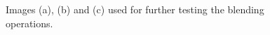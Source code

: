 \documentclass[12pt,a4paper]{article}
\begin{document}
\begin{figure}[!h]
{		{
			\setlength{\fboxsep}{1pt}
			\setlength{\fboxrule}{1pt}
		}
	}
	\caption{Images (a), (b) and (c) used for further testing the blending operations.}
	\label{fig:blendingFurther}
\end{figure}
\end{document}
